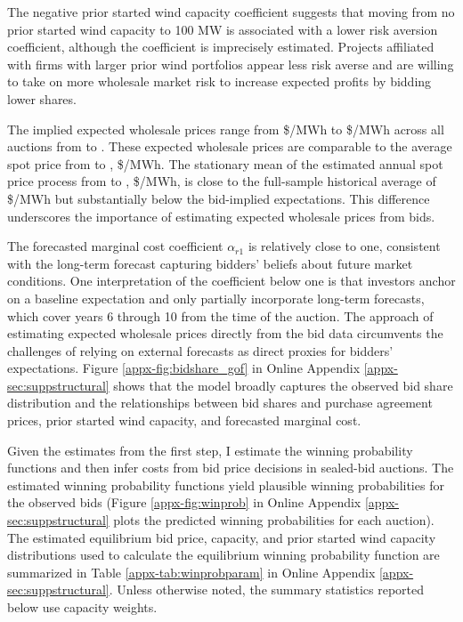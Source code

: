 \documentclass[12pt]{article}
\theoremstyle{definition} %
\begin{document}
The negative prior started wind capacity coefficient suggests that moving from no prior started wind capacity to 100 MW is associated with a  lower risk aversion coefficient, although the coefficient is imprecisely estimated. Projects affiliated with firms with larger prior wind portfolios appear less risk averse and are willing to take on more wholesale market risk to increase expected profits by bidding lower shares.

The implied expected wholesale prices range from \$/MWh to \$/MWh across all auctions from  to . These expected wholesale prices are comparable to the average spot price from  to , \$/MWh. The stationary mean of the estimated annual spot price process from  to , \$/MWh, is close to the full-sample historical average of \$/MWh but substantially below the bid-implied expectations. This difference underscores the importance of estimating expected wholesale prices from bids.

The forecasted marginal cost coefficient $\alpha_{r1}$ is relatively close to one, consistent with the long-term forecast capturing bidders' beliefs about future market conditions. One interpretation of the coefficient below one is that investors anchor on a baseline expectation and only partially incorporate long-term forecasts, which cover years 6 through 10 from the time of the auction. The approach of estimating expected wholesale prices directly from the bid data circumvents the challenges of relying on external forecasts as direct proxies for bidders' expectations. Figure \ref{appx-fig:bidshare_gof} in Online Appendix \ref{appx-sec:suppstructural} shows that the model broadly captures the observed bid share distribution and the relationships between bid shares and purchase agreement prices, prior started wind capacity, and forecasted marginal cost.

Given the estimates from the first step, I estimate the winning probability functions and then infer costs from bid price decisions in  sealed-bid auctions. The estimated winning probability functions yield plausible winning probabilities for the observed bids (Figure \ref{appx-fig:winprob} in Online Appendix \ref{appx-sec:suppstructural} plots the predicted winning probabilities for each auction). The estimated equilibrium bid price, capacity, and prior started wind capacity distributions used to calculate the equilibrium winning probability function are summarized in Table \ref{appx-tab:winprobparam} in Online Appendix \ref{appx-sec:suppstructural}. Unless otherwise noted, the summary statistics reported below use capacity weights.
\end{document}
